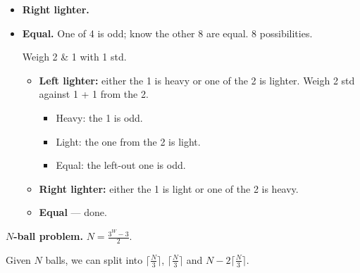 \documentclass[10pt,\jkfside,a4paper]{article}
\begin{document}
\begin{enumerate}
{\begin{itemize}
            Weigh 2 heavy + 2 light on one side, 1 light on the other.
            \begin{itemize}
                \item \textbf{Left light:} one of the left 2 is light. Weigh: compare the two.
                \item \textbf{Right light:} either the right 1 is light, or one of the left 2 is heavy.
                \item \textbf{Equal:} either 1 heavy or 2 light. Weigh 1 + 1 with 2 std.
                \begin{itemize}
                    \item Equal: know.
                    \item Left light: light.
                    \item Right light: heavy is heavy.
                \end{itemize}
            \end{itemize}

            \item \textbf{Right lighter.}

            \item \textbf{Equal.} One of 4 is odd; know the other 8 are equal. 8 possibilities.

            Weigh 2 \& 1 with 1 std.
            \begin{itemize}
                \item \textbf{Left lighter:} either the 1 is heavy or one of the 2 is lighter. Weigh 2 std against 1 + 1 from the 2.
                \begin{itemize}
                    \item Heavy: the 1 is odd.
                    \item Light: the one from the 2 is light.
                    \item Equal: the left-out one is odd.
                \end{itemize}
                \item \textbf{Right lighter:} either the 1 is light or one of the 2 is heavy.
                \item \textbf{Equal} --- done.
            \end{itemize}
        \end{itemize}

        \textbf{$N$-ball problem.} $N = \frac{3^W - 3}{2}$.

        Given $N$ balls, we can split into $\lceil \frac{N}{3} \rceil$, $\lceil \frac{N}{3} \rceil$ and $N - 2\lceil \frac{N}{3} \rceil$.

}
\end{enumerate}
\end{document}
